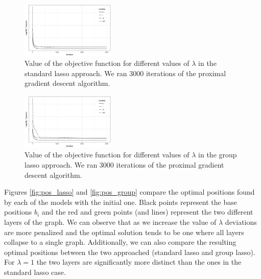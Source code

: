 \documentclass{article}
\begin{document}
\begin{figure}[h!]
   \centering
   \includegraphics[width=0.4\textwidth]{plot_objective_individual} %
   \caption{Value of the objective function for different values of $\lambda$ in the standard lasso approach. We ran 3000 iterations of the proximal gradient descent algorithm.}
   \label{fig:obj_lasso}
\end{figure}

\begin{figure}[h!]
   \centering
   \includegraphics[width=0.4\textwidth]{plot_objective_group} %
   \caption{Value of the objective function for different values of $\lambda$ in the group lasso approach. We ran 3000 iterations of the proximal gradient descent algorithm.}
   \label{fig:obj_group}
\end{figure}

Figures \ref{fig:pos_lasso} and \ref{fig:pos_group} compare the optimal positions found by each of the models with the initial one. Black points represent the base positions $b_i$ and the red and green points (and lines) represent the two different layers of the graph. We can observe that as we increase the value of $\lambda$ deviations are more penalized and the optimal solution tends to be one where all layers collapse to a single graph. Additionally, we can also compare the resulting optimal positions between the two approached (standard lasso and group lasso). For $\lambda=1$ the two layers are significantly more distinct than the ones in the standard lasso case.
\end{document}
